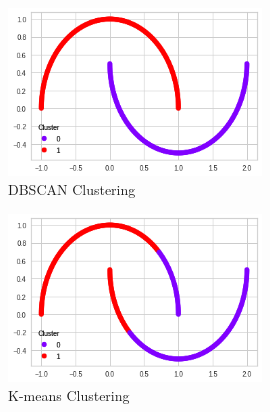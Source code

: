 \documentclass[12pt,letterpaper, onecolumn]{exam}
\begin{document}
\begin{figure}[!h]
\centering
\caption{DBSCAN Clustering}
\includegraphics[width = 0.6\textwidth]{../images/DBSCAN_plot}
\end{figure}
\begin{figure}[!h]
\centering
\caption{K-means Clustering}
\includegraphics[width = 0.6\textwidth]{../images/K-Means_plot}
\end{figure}
\end{document}
